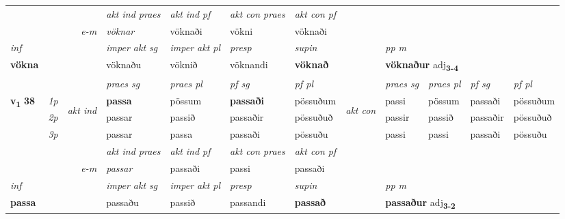 \begin{longtable}[l]{X>{\footnotesize\itshape}llXXXXlXXXX}
   && &  \textit{akt ind praes} & \textit{akt ind pf} & \textit{akt con praes} & \textit{akt con pf} \\*
\multicolumn{3}{r}{\textit{e-m}} & vöknar & vöknaði & vökni & vöknaði \\*

\cmidrule{4-7}
   {\textit{inf}} & &  & \textit{imper akt sg} & \textit{imper akt pl}   & \textit{presp} & \textit{supin}  && \textit{pp m} \\*
  {\textbf{vökna}} & && vöknaðu  & vöknið   & vöknandi &  \textbf{vöknað}  && \multicolumn{2}{l}{\textbf{vöknaður} adj\textbf{\textsubscript{3-4}}} \\*

\midrule

 & &   & \textit{praes sg}  & \textit{praes pl}    & \textit{ pf sg} & \textit{pf pl} & & \textit{praes sg}  & \textit{praes pl}    & \textit{pf sg} & \textit{pf pl }  \\ \cmidrule{4-7} \cmidrule{9-12}
 \multirow{2}{*}{{{\textbf{v{\textsubscript{1}}} \Large{\textbf{38}}}}}  & 1p & \multirow{3}{*}{\begin{turn}{90}\textit{akt ind}\end{turn}} & \textbf{passa} & pössum & \textbf{passaði} & pössuðum & \multirow{3}{*}{\begin{turn}{90}\textit{akt con}\end{turn}} &passi & pössum & passaði & pössuðum\\*
 & 2p &  &  passar  & passið & passaðir & pössuðuð & & passir & passið & passaðir & pössuðuð \\*
 & 3p &  & passar & passa & passaði & pössuðu & & passi & passi& passaði & pössuðu \\*
\cmidrule{4-7} \cmidrule{9-12}

   && &  \textit{akt ind praes} & \textit{akt ind pf} & \textit{akt con praes} & \textit{akt con pf} \\*
\multicolumn{3}{r}{\textit{e-m}} & passar & passaði & passi & passaði \\*

\cmidrule{4-7}
   {\textit{inf}} & &  & \textit{imper akt sg} & \textit{imper akt pl}   & \textit{presp} & \textit{supin}  && \textit{pp m} \\*
  {\textbf{passa}} & && passaðu  & passið   & passandi &  \textbf{passað}  && \multicolumn{2}{l}{\textbf{passaður} adj\textbf{\textsubscript{3-2}}} \\*

\midrule


\end{longtable}
